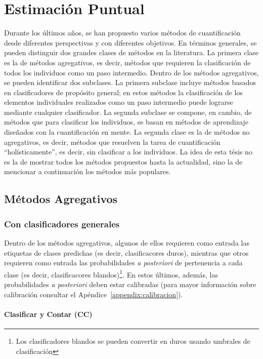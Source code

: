 \chapter{Estimación Puntual}

Durante los últimos años, se han propuesto varios métodos de cuantificación
desde diferentes perspectivas y con diferentes objetivos. En términos generales,
se pueden distinguir dos grandes clases de métodos en la literatura. La primera
clase es la de métodos agregativos, es decir, métodos que requieren la
clasificación de todos los individuos como un paso intermedio. Dentro de los
métodos agregativos, se pueden identificar dos subclases. La primera subclase
incluye métodos basados en clasificadores de propósito general; en estos métodos
la clasificación de los elementos individuales realizados como un paso
intermedio puede lograrse mediante cualquier clasificador. La segunda subclase
se compone, en cambio, de métodos que para clasificar los individuos, se basan
en métodos de aprendizaje diseñados con la cuantificación en mente. La segunda
clase es la de métodos no agregativos, es decir, métodos que resuelven la tarea
de cuantificación “holísticamente”, es decir, sin clasificar a los individuos.
La idea de esta tésis no es la de mostrar todos los métodos propuestos hasta la
actualidad, sino la de mencionar a continuación los métodos más populares.

\section{Métodos Agregativos}\label{puntual:agregativos}

\subsection{Con clasificadores generales}

Dentro de los métodos agregativos, algunos de ellos requieren como entrada las
etiquetas de clases predichas (es decir, clasificacores duros), mientras que
otros requieren como entrada las probabilidades {\it a posteriori\/} de
pertenencia a cada clase (es decir, clasificacores blandos)\footnote{Los
clasificadores blandos se pueden convertir en duros usando umbrales de
clasificación}. En estos últimos, además, las probabilidades {\it a
posteriori\/} deben estar calibradas (para mayor información sobre calibración
consultar el Apéndice~\ref{appendix:calibracion}).

\subsubsection{Clasificar y Contar (CC)}

